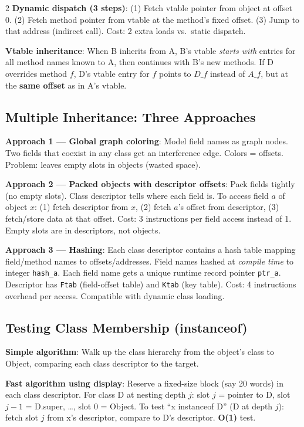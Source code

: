 \documentclass[9pt,landscape]{extarticle}
\begin{document}
\begin{multicols}{2}
\textbf{Dynamic dispatch (3 steps)}: (1) Fetch vtable pointer from object at offset 0. (2) Fetch method pointer from vtable at the method's fixed offset. (3) Jump to that address (indirect call). Cost: 2 extra loads vs.\ static dispatch.

\textbf{Vtable inheritance}: When B inherits from A, B's vtable \emph{starts with} entries for all method names known to A, then continues with B's new methods. If D overrides method $f$, D's vtable entry for $f$ points to $D\_f$ instead of $A\_f$, but at the \textbf{same offset} as in A's vtable.

\subsection{Multiple Inheritance: Three Approaches}

\textbf{Approach 1 --- Global graph coloring}: Model field names as graph nodes. Two fields that coexist in any class get an interference edge. Colors = offsets. Problem: leaves empty slots in objects (wasted space).

\textbf{Approach 2 --- Packed objects with descriptor offsets}: Pack fields tightly (no empty slots). Class descriptor tells where each field is. To access field $a$ of object $x$: (1) fetch descriptor from $x$, (2) fetch $a$'s offset from descriptor, (3) fetch/store data at that offset. Cost: 3 instructions per field access instead of 1. Empty slots are in descriptors, not objects.

\textbf{Approach 3 --- Hashing}: Each class descriptor contains a hash table mapping field/method names to offsets/addresses. Field names hashed at \emph{compile time} to integer \texttt{hash\_a}. Each field name gets a unique runtime record pointer \texttt{ptr\_a}. Descriptor has \texttt{Ftab} (field-offset table) and \texttt{Ktab} (key table). Cost: 4 instructions overhead per access. Compatible with dynamic class loading.

\subsection{Testing Class Membership (instanceof)}

\textbf{Simple algorithm}: Walk up the class hierarchy from the object's class to Object, comparing each class descriptor to the target.

\textbf{Fast algorithm using display}: Reserve a fixed-size block (say 20 words) in each class descriptor. For class D at nesting depth $j$: slot $j$ = pointer to D, slot $j-1$ = D.super, \ldots, slot 0 = Object. To test ``x instanceof D'' (D at depth $j$): fetch slot $j$ from x's descriptor, compare to D's descriptor. \textbf{O(1)} test.


\end{multicols}
\end{document}
